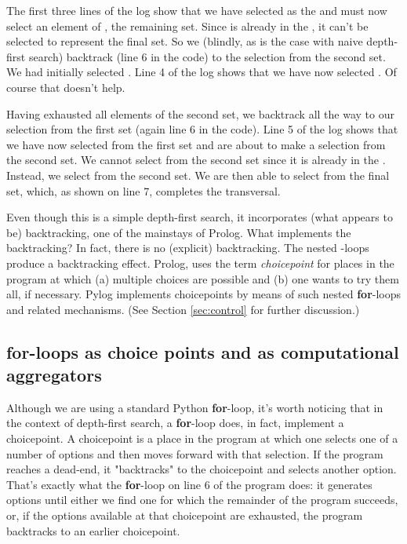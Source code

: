 The first three lines of the log show that we have selected  as the  and must now select an element of \textittt{[1]}, the remaining set. Since  is already in the , it can't be selected to represent the final set. So we (blindly, as is the case with naive depth-first search) backtrack (line 6 in the code) to the selection from the second set. We had initially selected . Line 4 of the log shows that we have now selected . Of course that doesn't help. 

Having exhausted all elements of the second set, we backtrack all the way to our selection from the first set (again line 6 in the code). Line 5 of the log shows that we have now selected  from the first set and are about to make a selection from the second set. We cannot select  from the second set since it is already in the . Instead, we select  from the second set. We are then able to select  from the final set, which, as shown on line 7, completes the transversal.

Even though this is a simple depth-first search, it incorporates (what appears to be) backtracking, one of the mainstays of Prolog. What implements the backtracking? In fact, there is no (explicit) backtracking. The nested -loops produce a backtracking effect.  Prolog, uses the term \textit{choicepoint} for places in the program at which (a) multiple choices are possible and (b) one wants to try them all, if necessary. Pylog implements choicepoints by means of such nested \textbf{for}-loops and related mechanisms. (See Section \ref{sec:control} for further discussion.)

\subsection{\textbf{for}-loops as choice points and as computational aggregators} \label{subsec:forloops}

Although we are using a standard Python \textbf{for}-loop, it's worth noticing that in the context of depth-first search, a \textbf{for}-loop does, in fact, implement a choicepoint. A choicepoint is a place in the program at which one selects one of a number of options and then moves forward with that selection. If the program reaches a dead-end, it "backtracks" to the choicepoint and selects another option. That's exactly what the \textbf{for}-loop on line 6 of the program does: it generates options until either we find one for which the remainder of the program succeeds, or, if the options available at that choicepoint are exhausted, the program backtracks to an earlier choicepoint.

